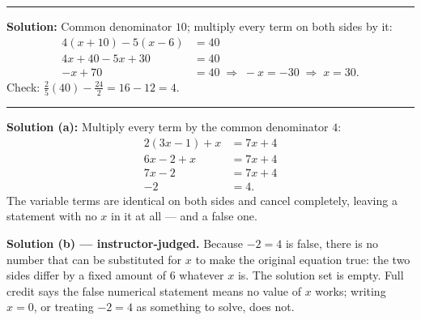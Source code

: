 \documentclass[12pt]{article}
\begin{document}
\vspace{0.15cm}\noindent\rule{\linewidth}{0.2pt}


\textbf{Solution:} \quad Common denominator $10$; multiply every term on both sides by it:
\begin{align*}
  4(x + 10) - 5(x - 6) &= 40\\
  4x + 40 - 5x + 30 &= 40\\
  -x + 70 &= 40 \;\Rightarrow\; -x = -30 \;\Rightarrow\; x = 30.
\end{align*}
Check: $\frac{2}{5}(40) - \frac{24}{2} = 16 - 12 = 4$. 

\vspace{0.15cm}\noindent\rule{\linewidth}{0.2pt}


\textbf{Solution (a):} \quad Multiply every term by the common denominator $4$:
\begin{align*}
  2(3x - 1) + x &= 7x + 4\\
  6x - 2 + x &= 7x + 4\\
  7x - 2 &= 7x + 4\\
  -2 &= 4.
\end{align*}
The variable terms are identical on both sides and cancel completely, leaving a statement with no
$x$ in it at all --- and a false one. 

\noindent\textbf{Solution (b) --- instructor-judged.} Because $-2 = 4$ is false, there is no number
that can be substituted for $x$ to make the original equation true: the two sides differ by a fixed
amount of $6$ whatever $x$ is. The solution set is empty. Full credit says the false numerical
statement means no value of $x$ works; writing $x = 0$, or treating $-2 = 4$ as something to solve,
does not.
\end{document}
